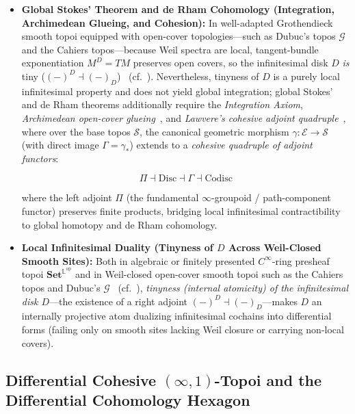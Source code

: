 \begin{enumerate}
  \begin{itemize}

    \item \textbf{Global Stokes' Theorem and de Rham Cohomology (Integration, Archimedean Glueing, and Cohesion):} In well-adapted Grothendieck smooth topoi equipped with open-cover topologies---such as Dubuc's topos $\mathcal{G}$ and the Cahiers topos---because Weil spectra are local, tangent-bundle exponentiation $M^D = TM$ preserves open covers, so the infinitesimal disk $D$ \emph{is} tiny ($(-)^D \dashv (-)_D$)~\cite[Ch.~III, Thm.~1.10 \& \S 2]{MoerdijkReyes91} (cf.~\cite{Kock06}). Nevertheless, tinyness of $D$ is a purely local infinitesimal property and does not yield global integration; global Stokes' and de Rham theorems additionally require the \emph{Integration Axiom}, \emph{Archimedean open-cover glueing}~\cite{MoerdijkReyes91}, and \emph{Lawvere's cohesive adjoint quadruple}~\cite{Lawvere07,Schreiber13}, where over the base topos $\mathcal{S}$, the canonical geometric morphism $\gamma: \mathcal{E} \to \mathcal{S}$ (with direct image $\Gamma = \gamma_*$) extends to a \emph{cohesive quadruple of adjoint functors}:

\[
  \Pi \dashv \mathrm{Disc} \dashv \Gamma \dashv \mathrm{Codisc}
\]

where the left adjoint $\Pi$ (the fundamental $\infty$-groupoid / path-component functor) preserves finite products, bridging local infinitesimal contractibility to global homotopy and de Rham cohomology.

    \item \textbf{Local Infinitesimal Duality (Tinyness of $D$ Across Weil-Closed Smooth Sites):} Both in algebraic or finitely presented $C^\infty$-ring presheaf topoi $\mathbf{Set}^{\mathbb{L}^{\mathrm{op}}}$ and in Weil-closed open-cover smooth topoi such as the Cahiers topos and Dubuc's $\mathcal{G}$~\cite[Ch.~III, Thm.~1.10 \& \S 2]{MoerdijkReyes91} (cf.~\cite{Kock06}), \emph{tinyness (internal atomicity) of the infinitesimal disk $D$}---the existence of a right adjoint $(-)^D \dashv (-)_D$---makes $D$ an internally projective atom dualizing infinitesimal cochains into differential forms (failing only on smooth sites lacking Weil closure or carrying non-local covers).

  \end{itemize}

\end{enumerate}

\subsection{Differential Cohesive $(\infty, 1)$-Topoi and the Differential Cohomology Hexagon}

